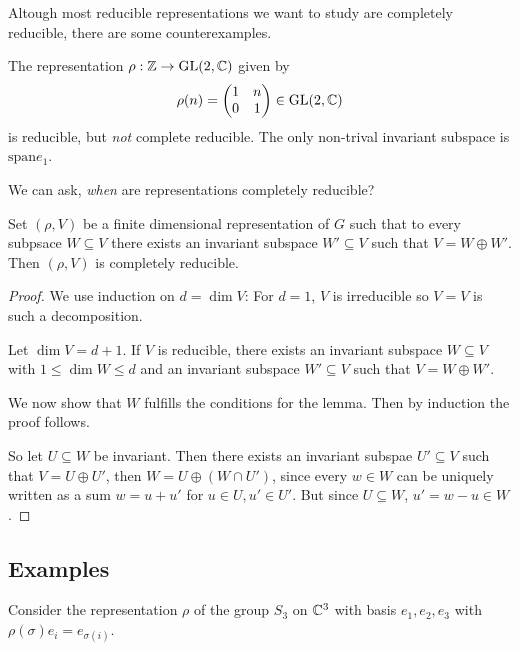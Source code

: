 Altough most reducible representations we want to study are completely reducible, there are some counterexamples.
\begin{ex}[]
  The representation $\rho: \mathbb{Z} \to \operatorname{GL}(2,\mathbb{C})$ given by
  \begin{align*}
    \rho(n) = \begin{pmatrix}
    1 & n\\
    0 & 1
    \end{pmatrix}
    \in \operatorname{GL}(2,\mathbb{C})
  \end{align*}
  is reducible, but \emph{not} complete reducible. 
  The only non-trival invariant subspace is $\text{span} e_1$.
\end{ex}

We can ask, \emph{when} are representations completely reducible?
\begin{lem}[]
  Set $(\rho,V)$ be a finite dimensional representation of $G$ such that to every subpsace $W \subseteq V$ there exists an invariant subspace $W' \subseteq V$ such that $V = W \oplus W'$. Then $(\rho,V)$ is completely reducible.
\end{lem}
\begin{proof}
We use induction on $d = \dim V$: For $d = 1$, $V$ is irreducible so $V = V$ is such a decomposition.

Let $\dim V = d + 1$. If $V$ is reducible, there exists an invariant subspace $W \subseteq V$ with $1 \leq \dim W \leq d$ and an invariant subspace $W' \subseteq V$ such that $V = W \oplus W'$.

We now show that $W$ fulfills the conditions for the lemma. Then by induction the proof follows.

So let $U \subseteq W$ be invariant. Then there exists an invariant subspae $U' \subseteq V$ such that $V = U \oplus U'$, then $W = U \oplus (W \cap U')$, since every $w \in W$ can be uniquely written as a sum $w = u + u'$ for $u \in U, u' \in U'$. But since $U \subseteq W$, $u' = w - u \in W$.
\end{proof}

\subsection{Examples}
Consider the representation $\rho$ of the group $S_3$ on $\mathbb{C}^{3}$ with basis $e_1,e_2,e_3$ with $\rho(\sigma)e_i = e_{\sigma(i)}$.

